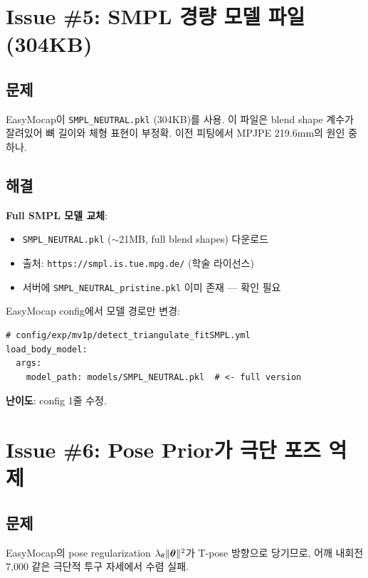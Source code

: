 \documentclass[11pt, a4paper]{report}
\begin{document}
\section{Issue \#5: SMPL 경량 모델 파일 (304KB)}

\subsection{문제}
EasyMocap이 \texttt{SMPL\_NEUTRAL.pkl} (304KB)를 사용. 이 파일은 blend shape 계수가 잘려있어 뼈 길이와 체형 표현이 부정확. 이전 피팅에서 MPJPE 219.6mm의 원인 중 하나.

\subsection{해결}

\begin{ossbox}
\textbf{Full SMPL 모델 교체}:
\begin{itemize}[leftmargin=*]
  \item \texttt{SMPL\_NEUTRAL.pkl} ($\sim$21MB, full blend shapes) 다운로드
  \item 출처: \texttt{https://smpl.is.tue.mpg.de/} (학술 라이선스)
  \item 서버에 \texttt{SMPL\_NEUTRAL\_pristine.pkl} 이미 존재 --- 확인 필요
\end{itemize}
\end{ossbox}

\begin{devbox}
EasyMocap config에서 모델 경로만 변경:
\begin{verbatim}
# config/exp/mv1p/detect_triangulate_fitSMPL.yml
load_body_model:
  args:
    model_path: models/SMPL_NEUTRAL.pkl  # <- full version
\end{verbatim}
\textbf{난이도}: config 1줄 수정.
\end{devbox}


\section{Issue \#6: Pose Prior가 극단 포즈 억제}

\subsection{문제}
EasyMocap의 pose regularization $\lambda_\theta \|\bm{\theta}\|^2$가 T-pose 방향으로 당기므로, 어깨 내회전 7,000\degps{} 같은 극단적 투구 자세에서 수렴 실패.
\end{document}
